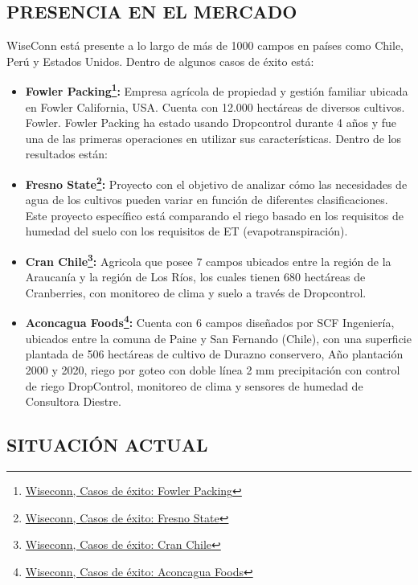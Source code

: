 \subsection{PRESENCIA EN EL MERCADO}
WiseConn está presente a lo largo de más de 1000 campos en países como Chile, Perú y Estados Unidos. Dentro de algunos casos de éxito está:
\begin{itemize}
	\item \textbf{Fowler Packing\footnote{\href{https://wiseconn.cl/kyle-moeller-fowler-packing/}{Wiseconn, Casos de éxito: Fowler Packing}}:} Empresa agrícola de propiedad y gestión familiar ubicada en Fowler California, USA. Cuenta con 12.000 hectáreas de diversos cultivos. Fowler. Fowler Packing ha estado usando Dropcontrol durante 4 años y fue una de las primeras operaciones en utilizar sus características. Dentro de los resultados están:	
	\item \textbf{Fresno State\footnote{\href{https://wiseconn.cl/nuestra-solucion/casos-de-exito/fresno-state/}{Wiseconn, Casos de éxito: Fresno State}}:} Proyecto con el objetivo de analizar cómo las necesidades de agua de los cultivos pueden variar en función de diferentes clasificaciones. Este proyecto específico está comparando el riego basado en los requisitos de humedad del suelo con los requisitos de ET (evapotranspiración).
	\item \textbf{Cran Chile\footnote{\href{https://wiseconn.cl/nuestra-solucion/casos-de-exito/fresno-state/}{Wiseconn, Casos de éxito: Cran Chile}}:} Agricola que posee 7 campos ubicados entre la región de la Araucanía y la región de Los Ríos, los cuales tienen 680 hectáreas de Cranberries, con monitoreo de clima y suelo a través de Dropcontrol.
	\item \textbf{Aconcagua Foods\footnote{\href{https://wiseconn.cl/nuestra-solucion/casos-de-exito/eugenio-navarro/}{Wiseconn, Casos de éxito: Aconcagua Foods}}:} Cuenta con 6 campos diseñados por SCF Ingeniería, ubicados entre la comuna de Paine y San Fernando (Chile), con una superficie plantada de 506 hectáreas de cultivo de Durazno conservero, Año plantación 2000 y 2020, riego por goteo con doble línea 2 mm precipitación con control de riego DropControl, monitoreo de clima y sensores de humedad de Consultora Diestre.
\end{itemize}

\subsection{SITUACIÓN ACTUAL}

